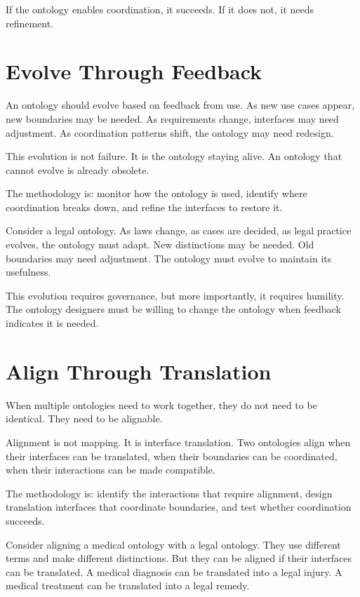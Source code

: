 \documentclass[
  openright]{book}
\begin{document}
If the ontology enables coordination, it succeeds. If it does not, it
needs refinement.

\section{Evolve Through Feedback}\label{evolve-through-feedback}

An ontology should evolve based on feedback from use. As new use cases
appear, new boundaries may be needed. As requirements change, interfaces
may need adjustment. As coordination patterns shift, the ontology may
need redesign.

This evolution is not failure. It is the ontology staying alive. An
ontology that cannot evolve is already obsolete.

The methodology is: monitor how the ontology is used, identify where
coordination breaks down, and refine the interfaces to restore it.

Consider a legal ontology. As laws change, as cases are decided, as
legal practice evolves, the ontology must adapt. New distinctions may be
needed. Old boundaries may need adjustment. The ontology must evolve to
maintain its usefulness.

This evolution requires governance, but more importantly, it requires
humility. The ontology designers must be willing to change the ontology
when feedback indicates it is needed.

\section{Align Through Translation}\label{align-through-translation}

When multiple ontologies need to work together, they do not need to be
identical. They need to be alignable.

Alignment is not mapping. It is interface translation. Two ontologies
align when their interfaces can be translated, when their boundaries can
be coordinated, when their interactions can be made compatible.

The methodology is: identify the interactions that require alignment,
design translation interfaces that coordinate boundaries, and test
whether coordination succeeds.

Consider aligning a medical ontology with a legal ontology. They use
different terms and make different distinctions. But they can be aligned
if their interfaces can be translated. A medical diagnosis can be
translated into a legal injury. A medical treatment can be translated
into a legal remedy.
\end{document}
